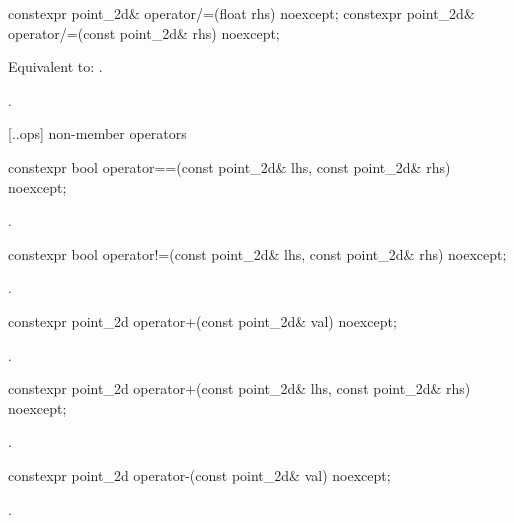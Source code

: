 %
\begin{itemdecl}
constexpr point_2d& operator/=(float rhs) noexcept;
constexpr point_2d& operator/=(const point_2d& rhs) noexcept;
\end{itemdecl}
\begin{itemdescr}
\pnum
\effects
Equivalent to: .

\pnum
\returns
{}.
\end{itemdescr}

 [\iotwod.\pointtwod.ops] { non-member operators}

%
\begin{itemdecl}
constexpr bool operator==(const point_2d& lhs, const point_2d& rhs) noexcept;
\end{itemdecl}
\begin{itemdescr}
\pnum
\returns
{}.
\end{itemdescr}

%
\begin{itemdecl}
constexpr bool operator!=(const point_2d& lhs, const point_2d& rhs) noexcept;
\end{itemdecl}
\begin{itemdescr}
\pnum
\returns
{}.
\end{itemdescr}

%
\begin{itemdecl}
constexpr point_2d operator+(const point_2d& val) noexcept;
\end{itemdecl}
\begin{itemdescr}
\pnum
\returns
{}.
\end{itemdescr}

%
\begin{itemdecl}
constexpr point_2d operator+(const point_2d& lhs, const point_2d& rhs) 
  noexcept;
\end{itemdecl}
\begin{itemdescr}
\pnum
\returns
{}.
\end{itemdescr}

%
\begin{itemdecl}
constexpr point_2d operator-(const point_2d& val) noexcept;
\end{itemdecl}
\begin{itemdescr}
\pnum
\returns
{}.
\end{itemdescr}

